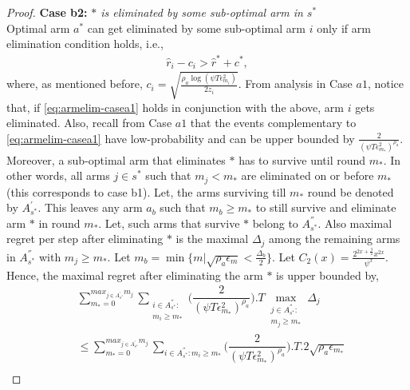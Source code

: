 \begin{proof}
\textbf{Case b2:} \textit{${*}$ is eliminated by some sub-optimal arm in $s^*$} \\
Optimal arm $a^*$ can get eliminated by some sub-optimal arm $i$ only if arm elimination condition holds, i.e., 
\begin{align*}
\hat r_{i} - c_{i} > \hat{r}^{*}+ c^{*},
\end{align*}
where, as mentioned before, $c_i  =\sqrt{\frac{\rho_{a}\log (\psi T\epsilon_{m_{i}}^{2})}{2 z_{i}}}$.
From analysis in Case $a1$, notice that, if \eqref{eq:armelim-casea1} holds in conjunction with the above, arm $i$ gets eliminated. Also, recall from Case $a1$ that the events complementary to \eqref{eq:armelim-casea1} have low-probability and can be upper bounded by $\frac{2}{(\psi  T\epsilon_{m_{*}}^{2})^{\rho_{a}}}$. Moreover, a sub-optimal arm that eliminates $*$ has to survive until round $m_*$. In other words, 
all arms ${j}\in s^{*}$ such that $m_{j} < m_{*}$ are eliminated on or before $m_*$ (this corresponds to case b1). 
Let, the arms surviving till $m_{*}$ round be denoted by $A^{'}_{s^{*}}$. This leaves any arm $a_{b}$ such that $m_{b}\geq m_{*} $ to still survive and eliminate arm ${*}$ in round $m_{*}$. Let, such arms that survive ${*}$ belong to $A^{''}_{s^{*}}$. Also maximal regret per step after eliminating ${*}$ is the maximal $\Delta_{j}$ among the remaining arms in $A^{''}_{s^{*}}$ with $m_{j}\geq m_{*}$.  Let $m_{b}=\min\lbrace m|\sqrt{\rho_{a}\epsilon_{m}}<\frac{\Delta_{b}}{2}\rbrace$. Let $C_2(x) = \frac{2^{2x+\frac{3}{2}}x^{2x}}{\psi^{x}}$. Hence, the maximal regret after eliminating the arm ${*}$ is upper bounded by, 
\begin{align*}
&\sum_{m_{*}=0}^{max_{j\in A^{'}_{s^{*}}}m_{j}}\sum_{\substack{i\in A^{''}_{s^{*}}: \\ m_{i}\geq m_{*}}}\bigg(\dfrac{2}{(\psi  T\epsilon_{m_{*}}^{2})^{\rho_{a}}} \bigg).T\max_{\substack{j\in A^{''}_{s^{*}}: \\ m_{j}\geq m_{*}}}{\Delta}_{j}\\
&\leq\sum_{m_{*}=0}^{max_{j\in A^{'}_{s^{*}}}m_{j}}\sum_{i\in A^{''}_{s^{*}}:m_{i} \geq m_{*}}\bigg(\dfrac{2}{(\psi  T\epsilon_{m_{*}}^{2})^{\rho_{a}}} \bigg).T.2\sqrt{\rho_{a}\epsilon_{m_{*}}} \\

\end{align*}
\end{proof}

